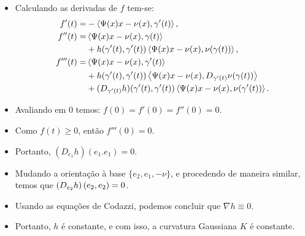 \documentclass[12pt,a4paper]{beamer}
\theoremstyle{definition}
\begin{document}
\begin{frame}
	\begin{itemize}
		\item Calculando as derivadas de $f$ tem-se:
		\begin{align*}
		f'(t) =& -\left\langle \Psi(x)x - \nu(x),\gamma'(t) \right\rangle,\\
		f''(t) =& \left\langle \Psi(x)x - \nu(x),\gamma(t) \right\rangle\\
		& + h(\gamma'(t),\gamma'(t)) \left\langle \Psi(x)x - \nu(x),\nu(\gamma(t)) \right\rangle,\\
		f'''(t) =& \left\langle \Psi(x)x - \nu(x),\gamma'(t) \right\rangle\\
		& + h(\gamma'(t),\gamma'(t)) \left\langle \Psi(x)x - \nu(x),D_{\gamma'(t)} \nu(\gamma(t)) \right\rangle\\
		& + (D_{\gamma'(t)} h) (\gamma'(t),\gamma'(t)) \left\langle \Psi(x)x - \nu(x),\nu(\gamma'(t)) \right\rangle.
		\end{align*}
	\end{itemize}
\end{frame}

\begin{frame}
	\begin{itemize}
		\item Avaliando em $0$ temos: $f(0)=f'(0)=f''(0)=0$.
		
		\item Como $f(t) \geq 0$, então $f'''(0)=0$.
		
		\item Portanto, $(D_{e_1}h)(e_1.e_1)=0$.
		
		\item Mudando a orientação à base $\{ e_2, e_1, -\nu \}$, e procedendo de maneira similar, temos que $\left( D_{e_2}h \right) \left( e_2,e_2 \right)=0$.
		
		\item Usando as equações de Codazzi, podemos concluir que $\nabla h \equiv 0$.
		
		\item Portanto, $h$ é constante, e com isso, a curvatura Gaussiana $K$ é constante.
	\end{itemize}
\end{frame}
\end{document}
